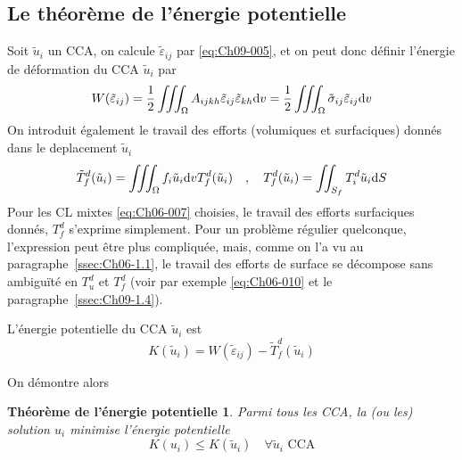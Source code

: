 \subsection{Le théorème de l'énergie potentielle} \label{ssec:Ch09-1.2}
Soit $\tilde{u}_i$ un CCA, on calcule $\tilde{\varepsilon}_{ij}$ par \eqref{eq:Ch09-005}, et on peut donc définir l'énergie de déformation du CCA $\tilde{u}_i$ par
\begin{equation}
    W(\tilde{\varepsilon}_{ij}) = \frac{1}{2} \iiint_{\Omega} A_{ijkh} \tilde{\varepsilon}_{ij} \tilde{\varepsilon}_{kh} \mathrm{d} v = \frac{1}{2} \iiint_{\Omega} \tilde{\sigma}_{ij} \tilde{\varepsilon}_{ij} \mathrm{d} v
    \label{eq:Ch09-013}
\end{equation}
On introduit également le travail des efforts (volumiques et surfaciques) donnés dans le deplacement $\tilde{u}_i$
\begin{equation}
    \tilde{T}_{f}^d (\tilde{u}_i) = \iiint_{\Omega} f_i \tilde{u}_i \mathrm{d} v T_f^d (\tilde{u}_i) \quad,\quad T_f^d(\tilde{u}_i) = \iint_{S_f} T_i^d \tilde{u}_i \mathrm{d} S
    \label{eq:Ch09-014}
\end{equation}
Pour les CL mixtes \eqref{eq:Ch06-007} choisies, le travail des efforts surfaciques donnés, $T_f^d$ s'exprime simplement.
Pour un problème régulier quelconque, l'expression peut être plus compliquée, mais, comme on l'a vu au paragraphe~\ref{ssec:Ch06-1.1}, le travail des efforts de surface se décompose sans ambiguïté en $T_u^d$ et $T_f^d$ (voir par exemple \eqref{eq:Ch06-010} et le paragraphe~\ref{ssec:Ch09-1.4}). 
\begin{defn}
    L'énergie potentielle du CCA $\tilde{u}_i$ est
    \begin{equation}
        K(\tilde{u}_i) = W(\tilde{\varepsilon}_{ij}) - \tilde{T}_f^d (\tilde{u}_i)
        \label{eq:Ch09-015}
    \end{equation}
\end{defn}
On 	démontre alors
\newtheorem*{ThEP}{Théorème de l'énergie potentielle}
\begin{ThEP}
    Parmi tous les CCA, la (ou les) solution $u_i$ minimise l'énergie potentielle
    \begin{equation}
        K(u_i) \leq K (\tilde{u}_i) \quad \forall \tilde{u}_i \text{ CCA}
        \label{eq:Ch09-016}
    \end{equation}
\end{ThEP}
